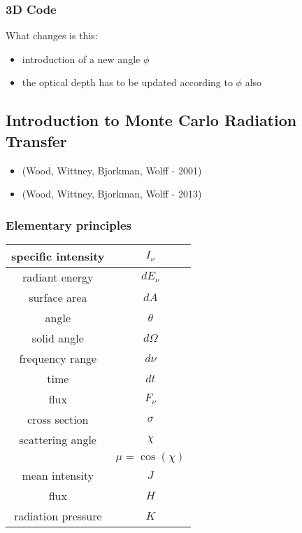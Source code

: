 \documentclass[../main/main.tex]{subfiles}
\begin{document}
\subsubsection{3D Code}
What changes is this: 
\begin{itemize}
\item introduction of a new angle $\phi$
\item the optical depth has to be updated according to $\phi$ also
\end{itemize}


\newpage
\subsection{Introduction to Monte Carlo Radiation Transfer}


\begin{itemize}
\item (Wood, Wittney, Bjorkman, Wolff - 2001)
\item (Wood, Wittney, Bjorkman, Wolff - 2013)
\end{itemize}

\subsubsection{Elementary principles}

\begin{center}
\centering
{\tabulinesep=1.5mm
\begin{tabu}{|c|c|}
\hline 
specific intensity & $I_{\nu}$ \\ \hline
radiant energy & $dE_{\nu}$ \\ \hline
surface area & $dA$ \\ \hline
angle & $\theta$ \\ \hline
solid angle & $d \Omega$ \\ \hline
frequency range & $d \nu$ \\ \hline
time & $dt$ \\ \hline
flux & $F_{\nu}$ \\ \hline
cross section & $\sigma$ \\ \hline
scattering angle & $\chi$ \\ 
 & $\mu = \cos(\chi)$ \\ \hline
mean intensity & $J$ \\ \hline
flux & $H$ \\ \hline
radiation pressure & $K$ \\ \hline
\end{tabu}}
\end{center}
\end{document}
